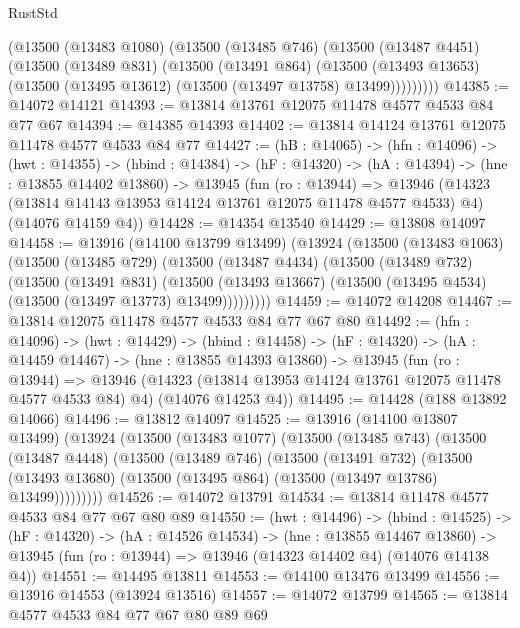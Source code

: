 \begin{lexlean}{RustStd}
\begin{coremodule}
      (@13500
        (@13483 @1080)
        (@13500
          (@13485 @746)
          (@13500
            (@13487 @4451)
            (@13500
              (@13489 @831)
              (@13500
                (@13491 @864)
                (@13500
                  (@13493 @13653)
                  (@13500 (@13495 @13612) (@13500 (@13497 @13758) @13499)))))))))
@14385 := @14072 @14121
@14393 := @13814 @13761 @12075 @11478 @4577 @4533 @84 @77 @67
@14394 := @14385 @14393
@14402 := @13814 @14124 @13761 @12075 @11478 @4577 @4533 @84 @77
@14427 := (hB : @14065) ->
  (hfn : @14096) ->
  (hwt : @14355) ->
  (hbind : @14384) ->
  (hF : @14320) ->
  (hA : @14394) ->
  (hne : @13855 @14402 @13860) ->
  @13945
    (fun (ro : @13944) =>
    @13946
      (@14323 (@13814 @14143 @13953 @14124 @13761 @12075 @11478 @4577 @4533) @4)
      (@14076 @14159 @4))
@14428 := @14354 @13540
@14429 := @13808 @14097
@14458 := @13916
    (@14100 @13799 @13499)
    (@13924
      (@13500
        (@13483 @1063)
        (@13500
          (@13485 @729)
          (@13500
            (@13487 @4434)
            (@13500
              (@13489 @732)
              (@13500
                (@13491 @831)
                (@13500
                  (@13493 @13667)
                  (@13500 (@13495 @4534) (@13500 (@13497 @13773) @13499)))))))))
@14459 := @14072 @14208
@14467 := @13814 @12075 @11478 @4577 @4533 @84 @77 @67 @80
@14492 := (hfn : @14096) ->
  (hwt : @14429) ->
  (hbind : @14458) ->
  (hF : @14320) ->
  (hA : @14459 @14467) ->
  (hne : @13855 @14393 @13860) ->
  @13945
    (fun (ro : @13944) =>
    @13946
      (@14323 (@13814 @13953 @14124 @13761 @12075 @11478 @4577 @4533 @84) @4)
      (@14076 @14253 @4))
@14495 := @14428 (@188 @13892 @14066)
@14496 := @13812 @14097
@14525 := @13916
    (@14100 @13807 @13499)
    (@13924
      (@13500
        (@13483 @1077)
        (@13500
          (@13485 @743)
          (@13500
            (@13487 @4448)
            (@13500
              (@13489 @746)
              (@13500
                (@13491 @732)
                (@13500
                  (@13493 @13680)
                  (@13500 (@13495 @864) (@13500 (@13497 @13786) @13499)))))))))
@14526 := @14072 @13791
@14534 := @13814 @11478 @4577 @4533 @84 @77 @67 @80 @89
@14550 := (hwt : @14496) ->
  (hbind : @14525) ->
  (hF : @14320) ->
  (hA : @14526 @14534) ->
  (hne : @13855 @14467 @13860) ->
  @13945 (fun (ro : @13944) => @13946 (@14323 @14402 @4) (@14076 @14138 @4))
@14551 := @14495 @13811
@14553 := @14100 @13476 @13499
@14556 := @13916 @14553 (@13924 @13516)
@14557 := @14072 @13799
@14565 := @13814 @4577 @4533 @84 @77 @67 @80 @89 @69

\end{coremodule}
\end{lexlean}
